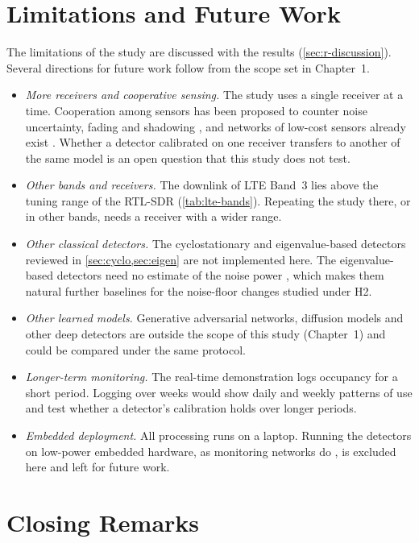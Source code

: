 
\section{Limitations and Future Work}
\label{sec:c-future}

The limitations of the study are discussed with the results (\cref{sec:r-discussion}). Several directions for future work follow from the scope set in Chapter~1.

\begin{itemize}
  \item \emph{More receivers and cooperative sensing.} The study uses a single receiver at a time. Cooperation among sensors has been proposed to counter noise uncertainty, fading and shadowing \parencite{yucek2009}, and networks of low-cost sensors already exist \parencite{rajendran2018}. Whether a detector calibrated on one receiver transfers to another of the same model is an open question that this study does not test.
  \item \emph{Other bands and receivers.} The downlink of LTE Band~3 lies above the tuning range of the RTL-SDR (\cref{tab:lte-bands}). Repeating the study there, or in other bands, needs a receiver with a wider range.
  \item \emph{Other classical detectors.} The cyclostationary and eigenvalue-based detectors reviewed in \cref{sec:cyclo,sec:eigen} are not implemented here. The eigenvalue-based detectors need no estimate of the noise power \parencite{zeng2009}, which makes them natural further baselines for the noise-floor changes studied under H2.
  \item \emph{Other learned models.} Generative adversarial networks, diffusion models and other deep detectors are outside the scope of this study (Chapter~1) and could be compared under the same protocol.
  \item \emph{Longer-term monitoring.} The real-time demonstration logs occupancy for a short period. Logging over weeks would show daily and weekly patterns of use and test whether a detector's calibration holds over longer periods.
  \item \emph{Embedded deployment.} All processing runs on a laptop. Running the detectors on low-power embedded hardware, as monitoring networks do \parencite{calvopalomino2015,rajendran2018}, is excluded here and left for future work.
\end{itemize}


\section{Closing Remarks}
\label{sec:c-closing}


